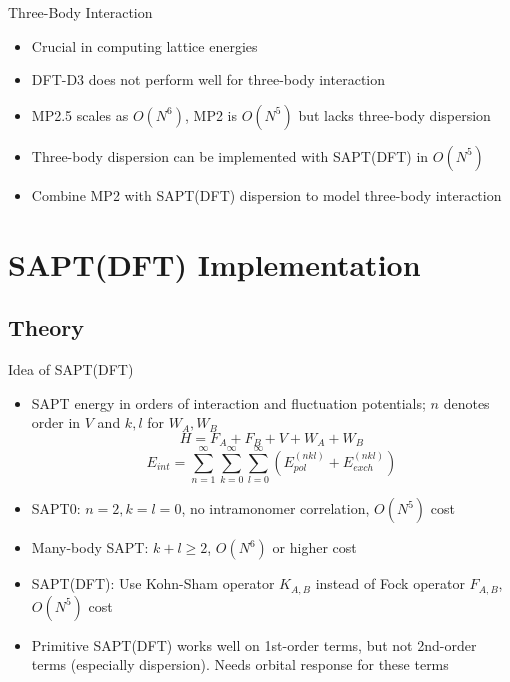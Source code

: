 \documentclass{beamer}
\begin{document}
    \begin{frame}{Three-Body Interaction}
        \begin{itemize}
            \item Crucial in computing lattice energies
            \item DFT-D3 does not perform well for three-body interaction
            \item MP2.5 scales as $O(N^6)$, MP2 is $O(N^5)$ but lacks three-body dispersion
            \item Three-body dispersion can be implemented with SAPT(DFT) in $O(N^5)$
            \item Combine MP2 with SAPT(DFT) dispersion to model three-body interaction  
        \end{itemize}   
    \end{frame}

\section{SAPT(DFT) Implementation}
    
    \subsection{Theory}
             
        \begin{frame}{Idea of SAPT(DFT)}
            \begin{itemize}
                \item SAPT energy in orders of interaction and fluctuation potentials; $n$ denotes order in $V$ and $k,l$ for $W_A, W_B$
                $$H = F_A + F_B + V + W_A + W_B$$
                $$E_{int} = \sum_{n=1}^\infty \sum_{k=0}^\infty \sum_{l=0}^\infty \left(E_{pol}^{(nkl)} + E_{exch}^{(nkl)}\right)$$
                \item SAPT0: $n = 2, k = l = 0$, no intramonomer correlation, $O(N^5)$ cost
                \item Many-body SAPT: $k+l \geq 2$, $O(N^6)$ or higher cost
                \item SAPT(DFT): Use Kohn-Sham operator $K_{A,B}$ instead of Fock operator $F_{A,B}$, $O(N^5)$ cost
                \item Primitive SAPT(DFT) works well on 1st-order terms, but not 2nd-order terms (especially dispersion). Needs orbital response for these terms
            \end{itemize}
        \end{frame}
\end{document}
